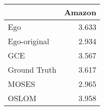 \begin{tabular}{lr}
\toprule
{} & Amazon \\
\midrule
Ego          &  3.633 \\
Ego-original &  2.934 \\
GCE          &  3.567 \\
Ground Truth &  3.617 \\
MOSES        &  2.965 \\
OSLOM        &  3.958 \\
\bottomrule
\end{tabular}
